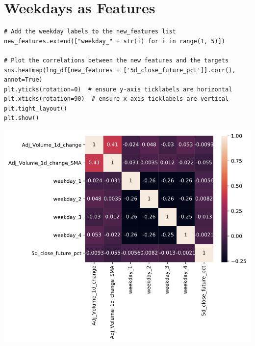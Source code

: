\documentclass[11pt]{article}
\begin{document}
\section{Weekdays as Features}
\label{sec:orgd5b926c}

\begin{verbatim}
# Add the weekday labels to the new_features list
new_features.extend(["weekday_" + str(i) for i in range(1, 5)])

# Plot the correlations between the new features and the targets
sns.heatmap(lng_df[new_features + ['5d_close_future_pct']].corr(), annot=True)
plt.yticks(rotation=0)  # ensure y-axis ticklabels are horizontal
plt.xticks(rotation=90)  # ensure x-axis ticklabels are vertical
plt.tight_layout()
plt.show()
\end{verbatim}


\begin{center}
\includegraphics[width=.9\linewidth]{weekday-corr.png}
\end{center}
\end{document}
